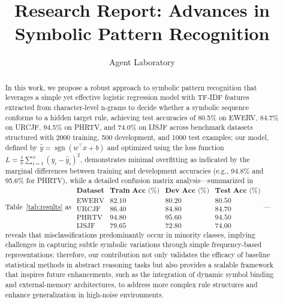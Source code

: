 \documentclass{article}
\title{Research Report: Advances in Symbolic Pattern Recognition}
\author{Agent Laboratory}
\date{}
\begin{document}
\maketitle

\begin{abstract}
In this work, we propose a robust approach to symbolic pattern recognition that leverages a simple yet effective logistic regression model with TF-IDF features extracted from character-level n-grams to decide whether a symbolic sequence conforms to a hidden target rule, achieving test accuracies of 80.5\% on EWERV, 84.7\% on URCJF, 94.5\% on PHRTV, and 74.0\% on IJSJF across benchmark datasets structured with 2000 training, 500 development, and 1000 test examples; our model, defined by $\hat{y} = \operatorname{sgn}(w^\top x+b)$ and optimized using the loss function $L=\frac{1}{n}\sum_{i=1}^{n}(y_i-\hat{y}_i)^2$, demonstrates minimal overfitting as indicated by the marginal differences between training and development accuracies (e.g., 94.8\% and 95.6\% for PHRTV), while a detailed confusion matrix analysis—summarized in Table~\ref{tab:results} as $\begin{array}{lccc}\textbf{Dataset} & \textbf{Train Acc (\%)} & \textbf{Dev Acc (\%)} & \textbf{Test Acc (\%)}\\ \hline \text{EWERV} & 82.10 & 80.20 & 80.50\\ \text{URCJF} & 86.40 & 84.80 & 84.70\\ \text{PHRTV} & 94.80 & 95.60 & 94.50\\ \text{IJSJF} & 79.65 & 72.80 & 74.00\end{array}$—reveals that misclassifications predominantly occur in minority classes, implying challenges in capturing subtle symbolic variations through simple frequency-based representations; therefore, our contribution not only validates the efficacy of baseline statistical methods in abstract reasoning tasks but also provides a scalable framework that inspires future enhancements, such as the integration of dynamic symbol binding and external-memory architectures, to address more complex rule structures and enhance generalization in high-noise environments.
\end{abstract}
\end{document}
